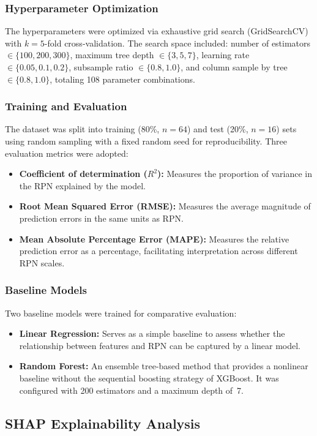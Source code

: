 \subsubsection{Hyperparameter Optimization}
The hyperparameters were optimized via exhaustive grid search (GridSearchCV) with $k=5$-fold cross-validation. The search space included: number of estimators $\in \{100, 200, 300\}$, maximum tree depth $\in \{3, 5, 7\}$, learning rate $\in \{0.05, 0.1, 0.2\}$, subsample ratio $\in \{0.8, 1.0\}$, and column sample by tree $\in \{0.8, 1.0\}$, totaling 108 parameter combinations.

\subsubsection{Training and Evaluation}
The dataset was split into training (80\%, $n=64$) and test (20\%, $n=16$) sets using random sampling with a fixed random seed for reproducibility. Three evaluation metrics were adopted:
\begin{itemize}
\item \textbf{Coefficient of determination ($R^2$):} Measures the proportion of variance in the RPN explained by the model.
\item \textbf{Root Mean Squared Error (RMSE):} Measures the average magnitude of prediction errors in the same units as RPN.
\item \textbf{Mean Absolute Percentage Error (MAPE):} Measures the relative prediction error as a percentage, facilitating interpretation across different RPN scales.
\end{itemize}

\subsubsection{Baseline Models}
Two baseline models were trained for comparative evaluation:
\begin{itemize}
\item \textbf{Linear Regression:} Serves as a simple baseline to assess whether the relationship between features and RPN can be captured by a linear model.
\item \textbf{Random Forest:} An ensemble tree-based method that provides a nonlinear baseline without the sequential boosting strategy of XGBoost. It was configured with 200 estimators and a maximum depth of~7.
\end{itemize}

\subsection{SHAP Explainability Analysis}
\label{subsec:shap}

